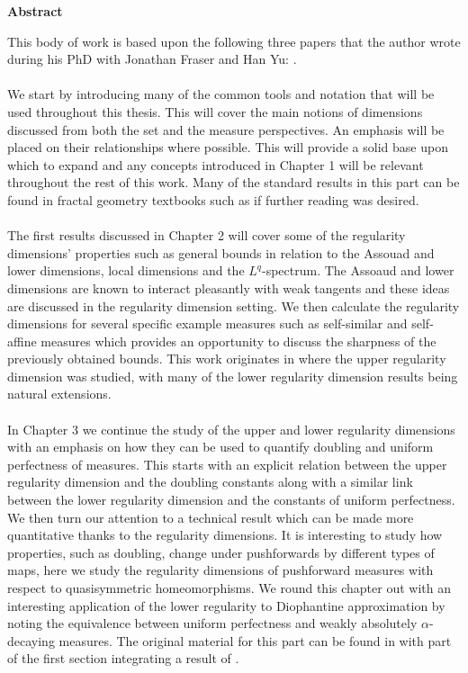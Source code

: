 \thispagestyle{plain}
\begin{center}
    \large
    \textbf{Abstract}
\end{center}


This body of work is based upon the following three papers that the author wrote during his PhD with Jonathan Fraser and Han Yu: \cite{fraser-howroyd2,howroyd-yu,howroyd}. 
\\ \\
We start by introducing many of the common tools and notation that will be used throughout this thesis. This will cover the main notions of dimensions discussed from both the set and the measure perspectives. An emphasis will be placed on their relationships where possible. This will provide a solid base upon which to expand and any concepts introduced in Chapter 1 will be relevant throughout the rest of this work. Many of the standard results in this part can be found in fractal geometry textbooks such as \cite{falconer, mattila} if further reading was desired.
\\ \\
The first results discussed in Chapter 2 will cover some of the regularity dimensions' properties such as general bounds in relation to the Assouad and lower dimensions, local dimensions and the $L^q$-spectrum. The Assoaud and lower dimensions are known to interact pleasantly with weak tangents and these ideas are discussed in the regularity dimension setting. We then calculate the regularity dimensions for several specific example measures such as self-similar and self-affine measures which provides an opportunity to discuss the sharpness of the previously obtained bounds. This work originates in \cite{fraser-howroyd2} where the upper regularity dimension was studied, with many of the lower regularity dimension results being natural extensions.
\\ \\
In Chapter 3 we continue the study of the upper and lower regularity dimensions with an emphasis on how they can be used to quantify doubling and uniform perfectness of measures. This starts with an explicit relation between the upper regularity dimension and the doubling constants along with a similar link between the lower regularity dimension and the constants of uniform perfectness. We then turn our attention to a technical result which can be made more quantitative thanks to the regularity dimensions. It is interesting to study how properties, such as doubling, change under pushforwards by different types of maps, here we study the regularity dimensions of pushforward measures with respect to quasisymmetric homeomorphisms. We round this chapter out with an interesting application of the lower regularity to Diophantine approximation by noting the equivalence between uniform perfectness and weakly absolutely $\alpha$-decaying measures. The original material for this part can be found in \cite{howroyd} with part of the first section integrating a result of \cite{fraser-howroyd2}. 
